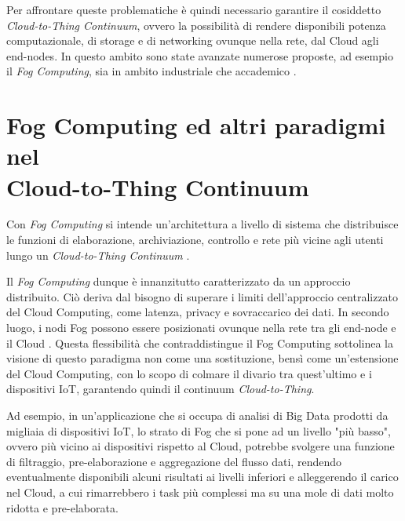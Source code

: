 Per affrontare queste problematiche è quindi necessario garantire il cosiddetto \textit{Cloud-to-Thing Continuum}, ovvero la possibilità di rendere disponibili potenza computazionale, di storage e di networking ovunque nella rete, dal Cloud agli end-nodes. In questo ambito sono state avanzate numerose proposte, ad esempio il \textit{Fog Computing}, sia in ambito industriale che accademico \cite{OpenFogReferenceArchitecture, FogComputingInIoT}.

\section[Fog Computing ed Altri Paradigmi nel Cloud-to-Thing Continuum]{Fog Computing ed altri paradigmi nel \\Cloud-to-Thing Continuum}

Con \textit{Fog Computing} si intende un'architettura a livello di sistema che distribuisce le funzioni di elaborazione, archiviazione, controllo e rete più vicine agli utenti lungo un \textit{Cloud-to-Thing Continuum} \cite{OpenFogReferenceArchitecture}.

Il \textit{Fog Computing} dunque è innanzitutto caratterizzato da un approccio distribuito. Ciò deriva dal bisogno di superare i limiti dell'approccio centralizzato del Cloud Computing, come latenza, privacy e sovraccarico dei dati. In secondo luogo, i nodi Fog possono essere posizionati ovunque nella rete tra gli end-node e il Cloud \cite{CloudComputingBigDataIssues}. Questa flessibilità che contraddistingue il Fog Computing sottolinea la visione di questo paradigma non come una sostituzione, bensì come un'estensione del Cloud Computing, con lo scopo di colmare il divario tra quest'ultimo e i dispositivi IoT, garantendo quindi il continuum \textit{Cloud-to-Thing}.

Ad esempio, in un'applicazione che si occupa di analisi di Big Data prodotti da migliaia di dispositivi IoT, lo strato di Fog che si pone ad un livello "più basso", ovvero più vicino ai dispositivi  rispetto al Cloud, potrebbe svolgere una funzione di filtraggio, pre-elaborazione e aggregazione del flusso dati, rendendo eventualmente disponibili alcuni risultati ai livelli inferiori e alleggerendo il carico nel Cloud, a cui rimarrebbero i task più complessi ma su una mole di dati molto ridotta e pre-elaborata.

